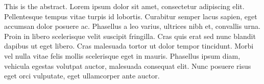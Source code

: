 This is the abstract. Lorem ipsum dolor sit amet, consectetur
adipiscing elit. Pellentesque tempus vitae turpis id lobortis. Curabitur semper
lacus sapien, eget accumsan dolor posuere ac. Phasellus a leo varius, ultrices
nibh et, convallis urna. Proin in libero scelerisque velit suscipit fringilla.
Cras quis erat sed nunc blandit dapibus ut eget libero. Cras malesuada tortor ut
dolor tempor tincidunt. Morbi vel nulla vitae felis mollis scelerisque eget in
mauris. Phasellus ipsum diam, vehicula egestas volutpat auctor, malesuada
consequat elit. Nunc posuere risus eget orci vulputate, eget ullamcorper ante
auctor.
